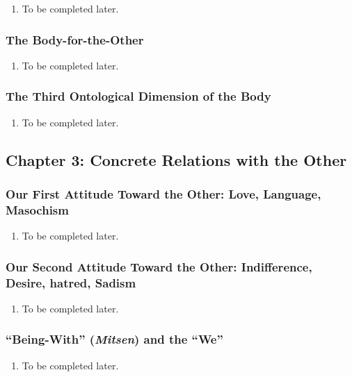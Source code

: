 \begin{enumerate}
  \item To be completed later.
\end{enumerate}

\subsubsection{The Body-for-the-Other}

\begin{enumerate}
  \item To be completed later.
\end{enumerate}

\subsubsection{The Third Ontological Dimension of the Body}

\begin{enumerate}
  \item To be completed later.
\end{enumerate}

\subsection{Chapter 3: Concrete Relations with the Other}

\subsubsection{Our First Attitude Toward the Other: Love, Language, Masochism}

\begin{enumerate}
  \item To be completed later.
\end{enumerate}

\subsubsection{Our Second Attitude Toward the Other: Indifference, Desire, hatred, Sadism}

\begin{enumerate}
  \item To be completed later.
\end{enumerate}

\subsubsection{\enquote{Being-With} (\emph{Mitsen}) and the \enquote{We}}

\begin{enumerate}
  \item To be completed later.
\end{enumerate}
